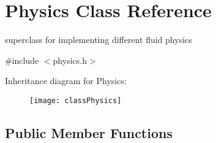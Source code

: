 \hypertarget{classPhysics}{\section{\-Physics \-Class \-Reference}
\label{classPhysics}
}


superclass for implementing different fluid physics  




{\ttfamily \#include $<$physics.\-h$>$}

\-Inheritance diagram for \-Physics\-:\begin{figure}[H]
\begin{center}
\leavevmode
\texttt{[image: classPhysics]}
\end{center}
\end{figure}
\subsection*{\-Public \-Member \-Functions}
